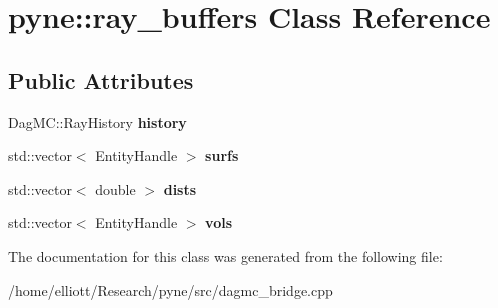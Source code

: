 \hypertarget{classpyne_1_1ray__buffers}{\section{pyne\-:\-:ray\-\_\-buffers Class Reference}
\label{classpyne_1_1ray__buffers}
}
\subsection*{Public Attributes}
\begin{DoxyCompactItemize}
\item 
\hypertarget{classpyne_1_1ray__buffers_adb3331dbf290b1c6d44c37931a917a7e}{Dag\-M\-C\-::\-Ray\-History {\bfseries history}}\label{classpyne_1_1ray__buffers_adb3331dbf290b1c6d44c37931a917a7e}

\item 
\hypertarget{classpyne_1_1ray__buffers_ac2a784c86703f7253861ceaa73ba5e6b}{std\-::vector$<$ Entity\-Handle $>$ {\bfseries surfs}}\label{classpyne_1_1ray__buffers_ac2a784c86703f7253861ceaa73ba5e6b}

\item 
\hypertarget{classpyne_1_1ray__buffers_a2904cd95dd5c1cb04ca796cf025bced1}{std\-::vector$<$ double $>$ {\bfseries dists}}\label{classpyne_1_1ray__buffers_a2904cd95dd5c1cb04ca796cf025bced1}

\item 
\hypertarget{classpyne_1_1ray__buffers_a2d059fcf9432e03b28eade60308b2498}{std\-::vector$<$ Entity\-Handle $>$ {\bfseries vols}}\label{classpyne_1_1ray__buffers_a2d059fcf9432e03b28eade60308b2498}

\end{DoxyCompactItemize}


The documentation for this class was generated from the following file\-:\begin{DoxyCompactItemize}
\item 
/home/elliott/\-Research/pyne/src/dagmc\-\_\-bridge.\-cpp\end{DoxyCompactItemize}
